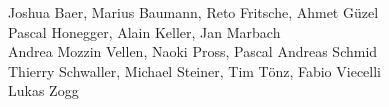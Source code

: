 %
%
%

Joshua Baer,                      %
Marius Baumann,                   %
Reto Fritsche,                    %
Ahmet Güzel%
\\
Pascal Honegger,                  %
Alain Keller,                     %
Jan Marbach%
\\
Andrea Mozzin Vellen,             %
Naoki Pross,                      %
Pascal Andreas Schmid%
\\
Thierry Schwaller,                %
Michael Steiner,                  %
Tim Tönz,                         %
Fabio Viecelli%
\\
Lukas Zogg%
